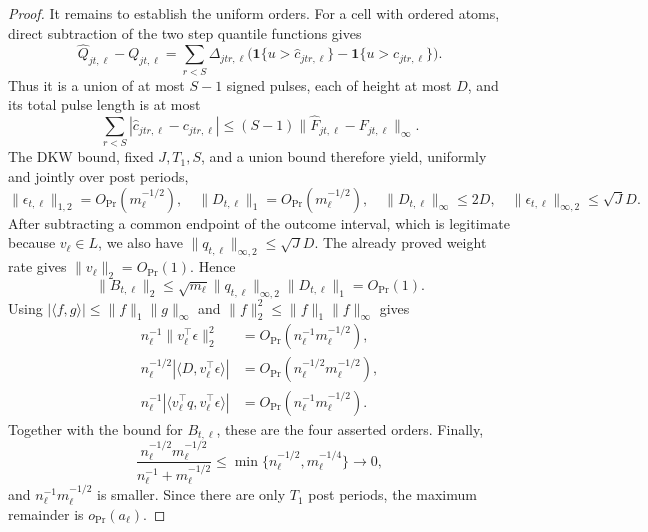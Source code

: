 \documentclass{article}
\begin{document}
\begin{proof}
It remains to establish the uniform orders.  For a cell with ordered atoms, direct subtraction of the two step quantile functions gives
\[
 \widehat Q_{jt,\ell}-Q_{jt,\ell}
 =\sum_{r<S}\Delta_{jtr,\ell}
 \bigl(\mathbf 1\{u>\widehat c_{jtr,\ell}\}
       -\mathbf 1\{u>c_{jtr,\ell}\}\bigr).
\]
Thus it is a union of at most \(S-1\) signed pulses, each of height at most \(D\), and its total pulse length is at most
\[
 \sum_{r<S}|\widehat c_{jtr,\ell}-c_{jtr,\ell}|
 \leq(S-1)\|\widehat F_{jt,\ell}-F_{jt,\ell}\|_\infty.
\]
The DKW bound, fixed \(J,T_1,S\), and a union bound therefore yield, uniformly and jointly over post periods,
\[
 \|\epsilon_{t,\ell}\|_{1,2}=O_{\Pr}(m_\ell^{-1/2}),\quad
 \|D_{t,\ell}\|_1=O_{\Pr}(m_\ell^{-1/2}),\quad
 \|D_{t,\ell}\|_\infty\leq2D,
 \quad \|\epsilon_{t,\ell}\|_{\infty,2}\leq\sqrt J D.
\]
After subtracting a common endpoint of the outcome interval, which is legitimate because \(v_\ell\in L\), we also have
\(\|q_{t,\ell}\|_{\infty,2}\leq\sqrt J D\).  The already proved weight rate gives \(\|v_\ell\|_2=O_{\Pr}(1)\).  Hence
\[
 \|B_{t,\ell}\|_2
 \leq\sqrt{m_\ell}\|q_{t,\ell}\|_{\infty,2}\|D_{t,\ell}\|_1
 =O_{\Pr}(1).
\]
Using \(|\langle f,g\rangle|\leq\|f\|_1\|g\|_\infty\) and
\(\|f\|_2^2\leq\|f\|_1\|f\|_\infty\) gives
\[
\begin{aligned}
 n_\ell^{-1}\|v_\ell^\top\epsilon\|_2^2
 &=O_{\Pr}(n_\ell^{-1}m_\ell^{-1/2}),\\
 n_\ell^{-1/2}|\langle D,v_\ell^\top\epsilon\rangle|
 &=O_{\Pr}(n_\ell^{-1/2}m_\ell^{-1/2}),\\
 n_\ell^{-1}|\langle v_\ell^\top q,v_\ell^\top\epsilon\rangle|
 &=O_{\Pr}(n_\ell^{-1}m_\ell^{-1/2}).
\end{aligned}
\]
Together with the bound for \(B_{t,\ell}\), these are the four asserted orders.  Finally,
\[
 \frac{n_\ell^{-1/2}m_\ell^{-1/2}}
 {n_\ell^{-1}+m_\ell^{-1/2}}
 \leq\min\{n_\ell^{-1/2},m_\ell^{-1/4}\}\longrightarrow0,
\]
and \(n_\ell^{-1}m_\ell^{-1/2}\) is smaller.  Since there are only \(T_1\) post periods, the maximum remainder is \(o_{\Pr}(a_\ell)\).
\end{proof}
\end{document}
